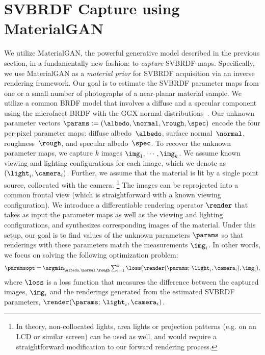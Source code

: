 \section{SVBRDF Capture using MaterialGAN}
\label{sec:framework}
%
We utilize MaterialGAN, the powerful generative model described in the previous section, in a fundamentally new fashion: to \emph{capture} SVBRDF maps.
Specifically, we use MaterialGAN as a \emph{material prior} for SVBRDF acquisition via an inverse rendering framework.
%
Our goal is to estimate the SVBRDF parameter maps from one or a small number of photographs of a near-planar material sample.
We utilize a common BRDF model that involves a diffuse and a specular component using the microfacet BRDF with the GGX normal distributions~\cite{Walter07}.
Our unknown parameter vectors $\params := (\albedo,\normal,\rough,\spec)$ encode the four per-pixel parameter maps: diffuse albedo~$\albedo$, surface normal~$\normal$, roughness~$\rough$, and specular albedo~$\spec$.
%
To recover the unknown parameter maps, we capture $k$ images $\img_1, \cdots, \img_k$.
We assume known viewing and lighting configurations for each image, which we denote as $(\light_i, \camera_i)$.
Further, we assume that the material is lit by a single point source, collocated with the camera.%
\footnote{%
	In theory, non-collocated lights, area lights or projection patterns (e.g. on an LCD or similar screen) can be used as well, and would require a straightforward modification to our forward rendering process.
}
The images can be reprojected into a common frontal view (which is straightforward with a known viewing configuration).
%
We introduce a differentiable rendering operator $\render$ that takes as input the parameter maps as well as the viewing and lighting configurations, and synthesizes corresponding images of the material.
Under this setup, our goal is to find values of the unknown parameters $\params$ so that renderings with these parameters match the measurements $\img_i$.
In other words, we focus on solving the following optimization problem:
%
\begin{equation}
	\label{eq:opt1}
	\paramsopt = \textstyle\argmin_{\albedo, \normal, \rough} \sum_{i=1}^k \loss(\render(\params; \,\light_i, \camera_i), \img_i),
\end{equation}
where $\loss$ is a loss function that measures the difference between the captured images, $\img_i$ and the renderings generated from the estimated SVBRDF parameters, $\render(\params; \,\light_i, \camera_i)$.
%

%
